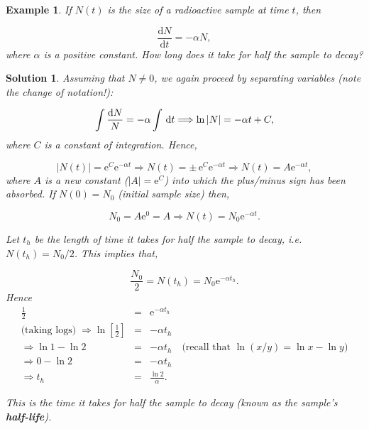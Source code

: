 \documentclass[a4paper]{report}
\newtheorem{example}{Example}[chapter]
\newtheorem*{solution}{Solution}
\begin{document}
\begin{example}
\label{ex:first:radio}
If $N(t)$ is the size of a radioactive sample at time $t$, then

\begin{displaymath}
\frac{\mathrm{d}N}{\mathrm{d}t} = -\alpha N,
\end{displaymath}
\noindent where $\alpha$ is a positive constant. How long does it take for half the sample to decay?
\end{example}

\begin{solution}
Assuming that $N\neq 0$, we again proceed by separating variables (note the change of notation!):

\begin{displaymath}
\int \frac{{\rm d}N}{N}=-\alpha\int \,\mathrm{d}t \Longrightarrow \ln|N| = -\alpha t + C,
\end{displaymath}
\noindent where $C$ is a constant of integration. Hence,

\begin{displaymath}
|N(t)| = \mathrm{e}^C \mathrm{e}^{-\alpha t} \Longrightarrow N(t) =\pm \,\mathrm{e}^C \mathrm{e}^{-\alpha t}\Longrightarrow  N(t) = A \mathrm{e}^{-\alpha t},
\end{displaymath}
\noindent where $A$ is a new constant ($|A|=\mathrm{e}^C$) into which the plus/minus sign has been absorbed. If $N(0)=N_0$ (initial sample size) then,

\begin{displaymath}
N_0 = A \mathrm{e}^0 = A \Longrightarrow N(t) = N_0 \mathrm{e}^{-\alpha t}.
\end{displaymath}


\noindent Let $t_h$ be the length of time it takes for half the sample to decay, i.e. $N(t_h) = N_0/2$. This implies that,

\begin{displaymath}   
\frac{N_0}{2} = N(t_h) = N_0 \mathrm{e}^{-\alpha t_h}.
\end{displaymath}
\noindent Hence
\begin{eqnarray*}
\frac{1}{2} &=& \mathrm{e}^{-\alpha t_h}\\
\mbox{(taking logs)}\;\Longrightarrow \ln \left[\frac{1}{2}\right] &=& -\alpha t_h\\
\Longrightarrow \ln 1 - \ln 2 &=& -\alpha t_h \quad\mbox{(recall that $\ln(x/y)=\ln x - \ln y)$}\\
\Longrightarrow 0 - \ln 2 &=& -\alpha t_h\\
\Longrightarrow t_h &=& \frac{\ln 2}{\alpha}. 
\end{eqnarray*}

\noindent This is the time it takes for half the sample to decay (known as the sample's {\bf half-life}).

\end{solution} 
\end{document}
